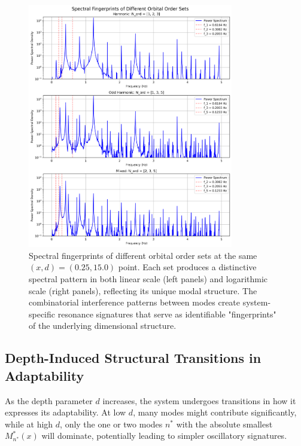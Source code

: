 \documentclass[11pt,a4paper]{article}
\begin{document}
\begin{figure}[H]
    \centering
    \includegraphics[width=0.8\textwidth]{figures/spectral_fingerprints.png}
    \caption{Spectral fingerprints of different orbital order sets at the same $(x,d) = (0.25, 15.0)$ point. Each set produces a distinctive spectral pattern in both linear scale (left panels) and logarithmic scale (right panels), reflecting its unique modal structure. The combinatorial interference patterns between modes create system-specific resonance signatures that serve as identifiable "fingerprints" of the underlying dimensional structure.}
    \label{fig:spectral_fingerprints}
\end{figure}

\subsection{Depth-Induced Structural Transitions in Adaptability}

As the depth parameter $d$ increases, the system undergoes transitions in how it expresses its adaptability. At low $d$, many modes might contribute significantly, while at high $d$, only the one or two modes $n^*$ with the absolute smallest $M_{n^*}^*(x)$ will dominate, potentially leading to simpler oscillatory signatures.
\end{document}
